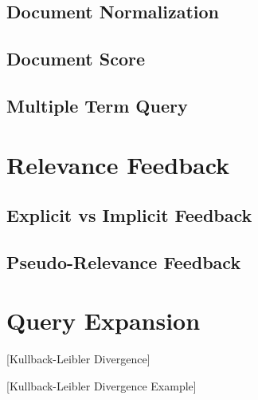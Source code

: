 \subsection{Document Normalization}

\subsection{Document Score}
\label{sec:doc-score}

\subsection{Multiple Term Query}

\section{Relevance Feedback}

\subsection{Explicit vs Implicit Feedback}

\subsection{Pseudo-Relevance Feedback}

\section{Query Expansion}
\label{sec:query-expansion}

[Kullback-Leibler Divergence]


[Kullback-Leibler Divergence Example]
